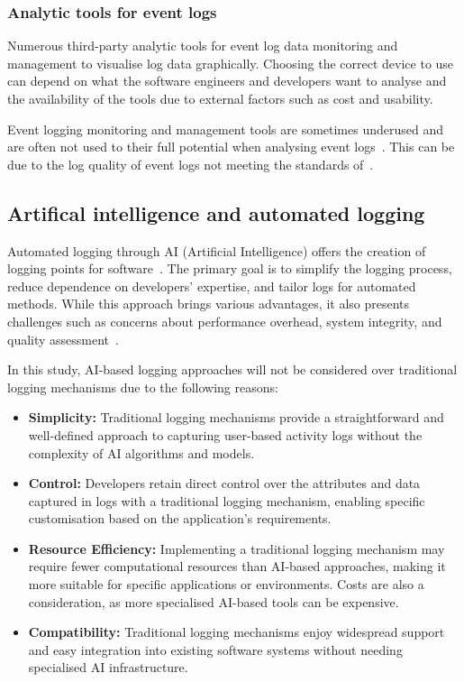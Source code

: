 \subsubsection{Analytic tools for event logs}
Numerous third-party analytic tools for event log data monitoring and management to visualise log data graphically. Choosing the correct device to use can depend on what the software engineers and developers want to analyse and the availability of the tools due to external factors such as cost and usability. \par Event logging monitoring and management tools are sometimes underused and are often not used to their full potential when analysing event logs~\cite{Fedaghi2010}. This can be due to the log quality of event logs not meeting the standards of~.

\subsection{Artifical intelligence and automated logging}\label{sec:ch1_AI}
Automated logging through AI (Artificial Intelligence) offers the creation of logging points for software~\cite{Bogatinovski2023}. The primary goal is to simplify the logging process, reduce dependence on developers' expertise, and tailor logs for automated methods. While this approach brings various advantages, it also presents challenges such as concerns about performance overhead, system integrity, and quality assessment~\cite{Bogatinovski2023,Zhu2019}. \par In this study, AI-based logging approaches will not be considered over traditional logging mechanisms due to the following reasons:

\begin{itemize}
	\item \RaggedRight \textbf{Simplicity:} Traditional logging mechanisms provide a straightforward and well-defined approach to capturing user-based activity logs without the complexity of AI algorithms and models.
 
	\item \textbf{Control:} Developers retain direct control over the attributes and data captured in logs with a traditional logging mechanism, enabling specific customisation based on the application's requirements.

	\item \textbf{Resource Efficiency:} Implementing a traditional logging mechanism may require fewer computational resources than AI-based approaches, making it more suitable for specific applications or environments. Costs are also a consideration, as more specialised AI-based tools can be expensive.
	
	\item \textbf{Compatibility:} Traditional logging mechanisms enjoy widespread support and easy integration into existing software systems without needing specialised AI infrastructure.
\end{itemize}


